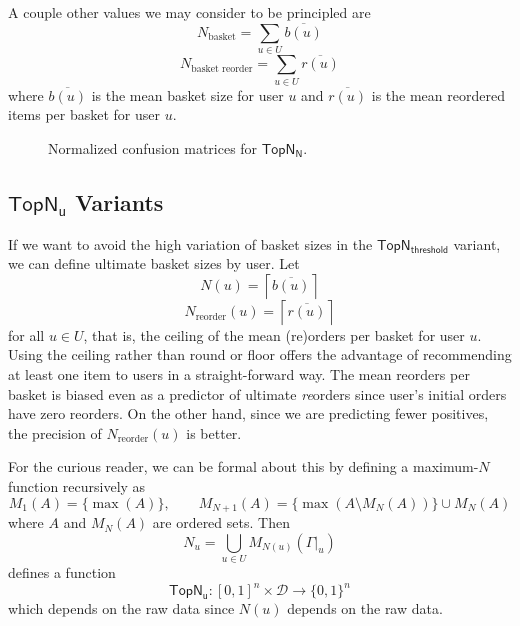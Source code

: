 \documentclass[11pt]{article}
\theoremstyle{definition}
\numberwithin{equation}{section}
\begin{document}
A couple other values we may consider to be principled are
\[ N_\text{basket} = \sum_{u \in U} \overline{ b(u) }\]
\[ N_\text{basket reorder} = \sum_{u \in U} \overline{ r(u) }\] where
\(\overline{b(u)}\) is the mean basket size for user \(u\) and
\(\overline{ r(u)}\) is the mean reordered items per basket for user
\(u\).





\begin{figure}[]
\begin{center}
\caption{Normalized confusion matrices for $\mathsf{TopN_N}$.}
\label{fig:top-n-confusion}
\end{center}
\end{figure}






    \hypertarget{topn-u-variants}{%
\subsection{\texorpdfstring{\(\mathsf{TopN_u}\)
Variants}{TopN_u) Variants}}\label{topn-u-variants}}



If we want to avoid the high variation of basket sizes in the
\(\mathsf{TopN_\textsf{threshold}}\) variant, we can define 
ultimate basket sizes by user. Let 
\[N(u) = \left\lceil \overline{b(u)} \right\rceil\]
\[N_\text{reorder}(u) = \left\lceil \overline{r(u)} \right\rceil\] 
for all \(u \in U\), that is, the ceiling of the mean (re)orders per basket
for user \(u\). Using the ceiling rather than round or floor offers the
advantage of recommending at least one item to users in a
straight-forward way. The mean reorders per basket is biased even as a
predictor of ultimate \emph{re}orders since user's initial orders have
zero reorders. On the other hand, since we are predicting fewer
positives, the precision of \(N_\text{reorder}(u)\) is better.







For the curious reader, we can be formal about this by defining a maximum-$N$
function recursively as
\begin{equation}\label{eq:MaxN}
M_1(A) = \{ \max (A) \}, \qquad M_{N+1} (A) = \{ \max (A \setminus M_N(A)) \} \cup M_N (A)
\end{equation}
where $A$ and $M_N(A)$ are ordered sets. Then 
\begin{equation}
N_u = \bigcup_{u \in U} M_{N(u)} (\Gamma|_u)
\end{equation}
defines a function
\begin{equation}
\mathsf{TopN_u} : [0, 1]^n \times \mathcal{D} \rightarrow \{0,1\}^n
\end{equation}
which depends on the raw data since $N(u)$ depends on the raw data.
\end{document}
